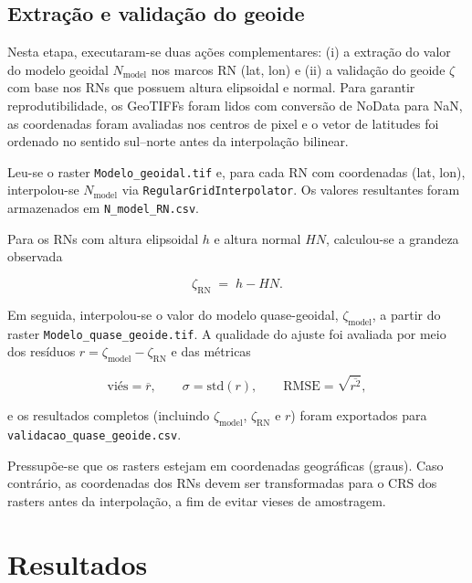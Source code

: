 \section{Extração e validação do geoide}

Nesta etapa, executaram-se duas ações complementares: (i) a extração do valor do modelo geoidal $N_{\text{model}}$ nos marcos RN (lat, lon) e (ii) a validação do geoide $\zeta$ com base nos RNs que possuem altura elipsoidal e normal. Para garantir reprodutibilidade, os GeoTIFFs foram lidos com conversão de NoData para NaN, as coordenadas foram avaliadas nos centros de pixel e o vetor de latitudes foi ordenado no sentido sul–norte antes da interpolação bilinear.

Leu-se o raster \texttt{Modelo\allowbreak\_geoidal.tif} e, para cada RN com coordenadas (lat, lon), interpolou-se $N_{\text{model}}$ via \texttt{RegularGridInterpolator}. Os valores resultantes foram armazenados em \texttt{N\allowbreak\_model\allowbreak\_RN.csv}.

Para os RNs com altura elipsoidal $h$ e altura normal $HN$, calculou-se a grandeza observada

\begin{equation}
    \zeta_{\mathrm{RN}} \;=\; h - HN.
\end{equation}


\noindent Em seguida, interpolou-se o valor do modelo quase-geoidal, $\zeta_{\text{model}}$, a partir do raster \texttt{Modelo\allowbreak\_quase\allowbreak\_geoide.tif}. A qualidade do ajuste foi avaliada por meio dos resíduos $r=\zeta_{\text{model}}-\zeta_{\mathrm{RN}}$ e das métricas

\begin{equation}
    \text{viés}=\overline{r},\qquad
    \sigma=\mathrm{std}(r),\qquad
    \mathrm{RMSE}=\sqrt{\overline{r^{2}}},
\end{equation}

\noindent e os resultados completos (incluindo $\zeta_{\text{model}}$, $\zeta_{\mathrm{RN}}$ e $r$) foram exportados para \texttt{validacao\allowbreak\_quase\allowbreak\_geoide.csv}.

Pressupõe-se que os rasters estejam em coordenadas geográficas (graus). Caso contrário, as coordenadas dos RNs devem ser transformadas para o CRS dos rasters antes da interpolação, a fim de evitar vieses de amostragem.


\chapter{Resultados}

